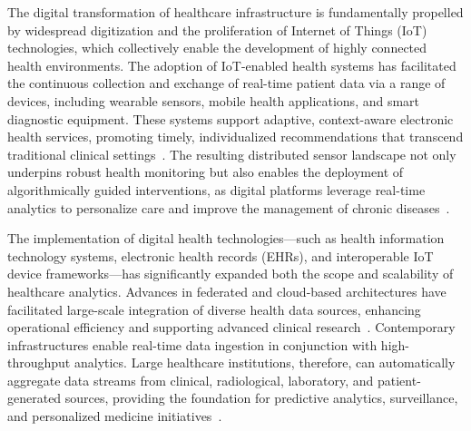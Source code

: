 \documentclass[sigconf]{acmart}
\begin{document}
The digital transformation of healthcare infrastructure is fundamentally propelled by widespread digitization and the proliferation of Internet of Things (IoT) technologies, which collectively enable the development of highly connected health environments. The adoption of IoT-enabled health systems has facilitated the continuous collection and exchange of real-time patient data via a range of devices, including wearable sensors, mobile health applications, and smart diagnostic equipment. These systems support adaptive, context-aware electronic health services, promoting timely, individualized recommendations that transcend traditional clinical settings~\cite{ref82,ref106}. The resulting distributed sensor landscape not only underpins robust health monitoring but also enables the deployment of algorithmically guided interventions, as digital platforms leverage real-time analytics to personalize care and improve the management of chronic diseases~\cite{ref106}.

The implementation of digital health technologies---such as health information technology systems, electronic health records (EHRs), and interoperable IoT device frameworks---has significantly expanded both the scope and scalability of healthcare analytics. Advances in federated and cloud-based architectures have facilitated large-scale integration of diverse health data sources, enhancing operational efficiency and supporting advanced clinical research~\cite{ref82,ref84,ref90,ref106}. Contemporary infrastructures enable real-time data ingestion in conjunction with high-throughput analytics. Large healthcare institutions, therefore, can automatically aggregate data streams from clinical, radiological, laboratory, and patient-generated sources, providing the foundation for predictive analytics, surveillance, and personalized medicine initiatives~\cite{ref106,ref84}.
\end{document}
